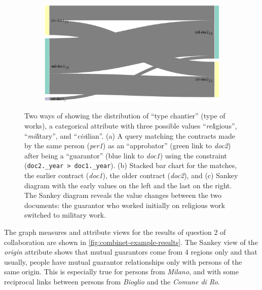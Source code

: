 \begin{figure}[!ht]
\begin{subfigure}[b]{0.3\linewidth}
    \caption{}
    \end{subfigure}
    \begin{subfigure}[b]{0.44\linewidth}
    \includegraphics[width=\textwidth]{static/figures/ComBiNet/OriginalPaperFigures/CGF/sankeyPLot/sankey_bigger.pdf}
    \caption{}
    \end{subfigure}
    \caption{Two ways of showing the distribution of ``type chantier'' (type of works), a categorical attribute with three possible values ``\textsl{rel}igious'', ``\textsl{mil}itary'', and ``\textsl{civ}ilian''.
    (a) A query matching the contracts made by the same person (\textit{per1}) as an ``approbator'' (green link to \textit{doc2}) after being a ``guarantor'' (blue link to \textit{doc1}) using the constraint (\texttt{doc2.\_year > doc1.\_year}). (b) Stacked bar chart for the matches, the earlier contract (\textit{doc1}), the older contract (\textit{doc2}), and (c) Sankey diagram with the early values on the left and the last on the right.
    The Sankey diagram reveals the value changes between the two documents: the guarantor who worked initially on religious work switched to military work.} \label{fig:sankeys}
\end{figure}

The graph measures and attribute views for the results of question 2 of collaboration \pascal are shown in \autoref{fig:combinet-example-results}.
The Sankey view of the \textit{origin} attribute shows that mutual guarantors come from 4 regions only and that usually, people have mutual guarantor relationships only with persons of the same origin.
This is especially true for persons from \textit{Milano}, and with some reciprocal links between persons from \textit{Bioglio} and the \textit{Comune di Ro}.




